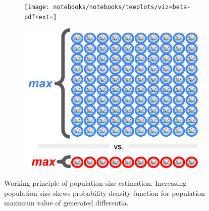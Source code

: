 \begin{figure}
  \centering
  \begin{subfigure}[b]{0.6\textwidth}
    \centering
    \texttt{[image: notebooks/notebooks/teeplots/viz=beta-pdf+ext=]}
  \end{subfigure}%
  \begin{subfigure}[b]{0.4\textwidth}
    \centering
    \includegraphics[width=\textwidth]{img/dice-pool}
    \vspace{3ex}
  \end{subfigure}
  \caption{
    Working principle of population size estimation.
    Increasing population size skews probability density function for population maximum value of generated differentia.
  }
  \label{fig:beta-explain}
\end{figure}
